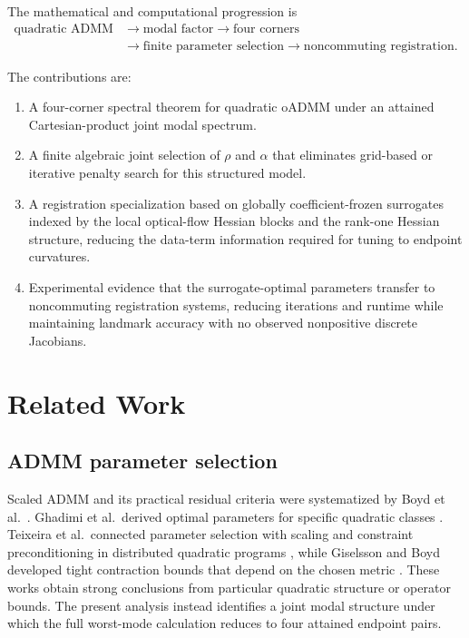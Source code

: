 \documentclass[11pt]{article}
\theoremstyle{definition}
\begin{document}
The mathematical and computational progression is
\begin{align*}
\text{quadratic ADMM}&\longrightarrow\text{modal factor}
\longrightarrow\text{four corners}\\
&\longrightarrow\text{finite parameter selection}
\longrightarrow\text{noncommuting registration}.
\end{align*}

The contributions are:
\begin{enumerate}
\item A four-corner spectral theorem for quadratic oADMM under an attained
Cartesian-product joint modal spectrum.
\item A finite algebraic joint selection of $\rho$ and $\alpha$ that eliminates
grid-based or iterative penalty search for this structured model.
\item A registration specialization based on globally coefficient-frozen
surrogates indexed by the local optical-flow Hessian blocks and the rank-one
Hessian structure, reducing the data-term information required for tuning to
endpoint curvatures.
\item Experimental evidence that the surrogate-optimal parameters transfer to
noncommuting registration systems, reducing iterations and runtime while
maintaining landmark accuracy with no observed nonpositive discrete Jacobians.
\end{enumerate}

\section{Related Work}\label{sec:related}
\subsection{ADMM parameter selection}
Scaled ADMM and its practical residual criteria were systematized by Boyd
et al.\ \cite{Boyd2010}. Ghadimi et al.\ derived optimal parameters for
specific quadratic classes \cite{Ghadimi2015}. Teixeira et al.\ connected
parameter selection with scaling and constraint preconditioning in distributed
quadratic programs \cite{Teixeira2016}, while Giselsson and Boyd developed
tight contraction bounds that depend on the chosen metric
\cite{GiselssonBoyd2017}. These works obtain strong conclusions from particular
quadratic structure or operator bounds. The present analysis instead
identifies a joint modal structure under which the full worst-mode calculation
reduces to four attained endpoint pairs.
\end{document}
